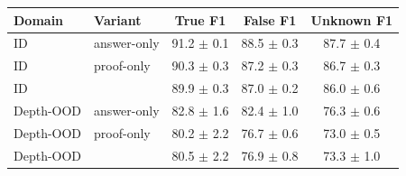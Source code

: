 \begin{tabular}{llccc}
\toprule
Domain & Variant & True F1 & False F1 & Unknown F1 \\
\midrule
ID & answer-only & 91.2 $\pm$ 0.1 & 88.5 $\pm$ 0.3 & 87.7 $\pm$ 0.4 \\
ID & proof-only & 90.3 $\pm$ 0.3 & 87.2 $\pm$ 0.3 & 86.7 $\pm$ 0.3 \\
ID & \model{} & 89.9 $\pm$ 0.3 & 87.0 $\pm$ 0.2 & 86.0 $\pm$ 0.6 \\
\midrule
Depth-OOD & answer-only & 82.8 $\pm$ 1.6 & 82.4 $\pm$ 1.0 & 76.3 $\pm$ 0.6 \\
Depth-OOD & proof-only & 80.2 $\pm$ 2.2 & 76.7 $\pm$ 0.6 & 73.0 $\pm$ 0.5 \\
Depth-OOD & \model{} & 80.5 $\pm$ 2.2 & 76.9 $\pm$ 0.8 & 73.3 $\pm$ 1.0 \\
\bottomrule
\end{tabular}